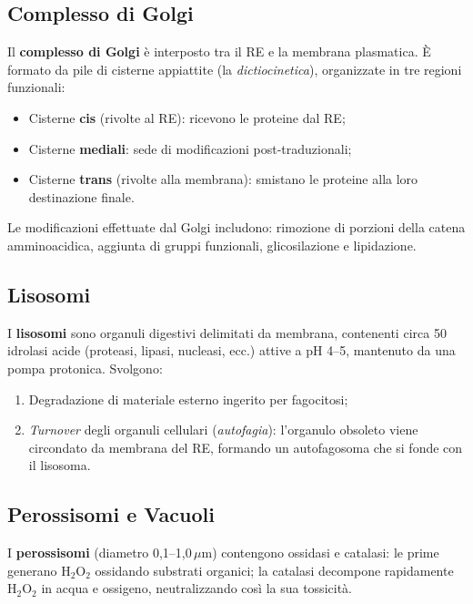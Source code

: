 \documentclass[11pt,a4paper,openright,twoside]{book}
\theoremstyle{definition}
\theoremstyle{plain}
\theoremstyle{remark}
\begin{document}
\subsection{Complesso di Golgi}

Il \textbf{complesso di Golgi} è interposto tra il RE e la membrana plasmatica. È formato da pile di cisterne appiattite (la \textit{dictiocinetica}), organizzate in tre regioni funzionali:
\begin{itemize}
  \item Cisterne \textbf{cis} (rivolte al RE): ricevono le proteine dal RE;
  \item Cisterne \textbf{mediali}: sede di modificazioni post-traduzionali;
  \item Cisterne \textbf{trans} (rivolte alla membrana): smistano le proteine alla loro destinazione finale.
\end{itemize}

Le modificazioni effettuate dal Golgi includono: rimozione di porzioni della catena amminoacidica, aggiunta di gruppi funzionali, glicosilazione e lipidazione.

\subsection{Lisosomi}

I \textbf{lisosomi} sono organuli digestivi delimitati da membrana, contenenti circa 50 idrolasi acide (proteasi, lipasi, nucleasi, ecc.) attive a pH 4--5, mantenuto da una pompa protonica. Svolgono:
\begin{enumerate}
  \item Degradazione di materiale esterno ingerito per fagocitosi;
  \item \textit{Turnover} degli organuli cellulari (\textit{autofagia}): l'organulo obsoleto viene circondato da membrana del RE, formando un autofagosoma che si fonde con il lisosoma.
\end{enumerate}

\subsection{Perossisomi e Vacuoli}

I \textbf{perossisomi} (diametro 0,1--1,0\,$\mu$m) contengono ossidasi e catalasi: le prime generano $\text{H}_2\text{O}_2$ ossidando substrati organici; la catalasi decompone rapidamente $\text{H}_2\text{O}_2$ in acqua e ossigeno, neutralizzando così la sua tossicità.
\end{document}
